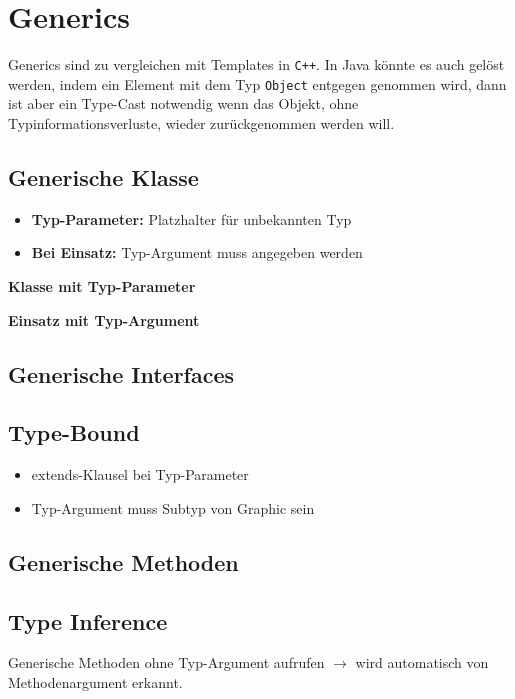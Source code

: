 \section*{Generics}
	Generics sind zu vergleichen mit Templates in \texttt{C++}. In Java könnte es auch gelöst werden, indem ein Element mit dem Typ \texttt{Object} entgegen genommen wird, dann ist aber ein Type-Cast notwendig wenn das Objekt, ohne Typinformationsverluste, wieder zurückgenommen werden will.
	\subsection*{Generische Klasse}
		\begin{minipage}[t]{8.5cm}
			\begin{itemize}[noitemsep]
				\item \textbf{Typ-Parameter:} Platzhalter für unbekannten Typ
				\item \textbf{Bei Einsatz:} Typ-Argument muss angegeben werden
			\end{itemize}
		\end{minipage}
		\hspace*{0.25cm}
		\begin{minipage}[t]{4.2cm}
			\textbf{Klasse mit Typ-Parameter}	
			
		\end{minipage}
		\hspace*{0.25cm}
		\begin{minipage}[t]{5.3cm}
			\textbf{Einsatz mit Typ-Argument}
			
		\end{minipage}
	\subsection*{Generische Interfaces}
		
	\subsection*{Type-Bound}
		
		\begin{itemize}[noitemsep]
			\item extends-Klausel bei Typ-Parameter
			\item Typ-Argument muss Subtyp von Graphic sein
		\end{itemize}
	\subsection*{Generische Methoden}
		
	\subsection*{Type Inference}
		Generische Methoden ohne Typ-Argument aufrufen $\rightarrow$ wird automatisch von Methodenargument erkannt.
		
	